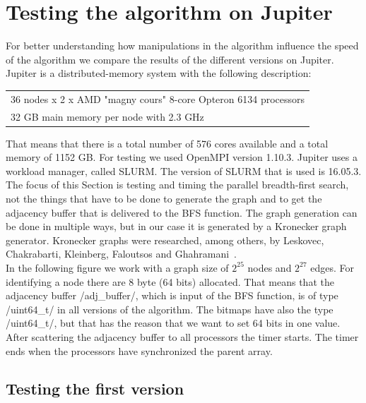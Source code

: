 \documentclass[12pt,a4paper]{article}
\begin{document}
\section{Testing the algorithm on Jupiter}
\label{sec:testing}

For better understanding how manipulations in the algorithm influence the speed of the algorithm we compare the results of the different versions on Jupiter.
Jupiter is a distributed-memory system with the following description:
\begin{flushleft}
\begin{tabular}{| l |}
  \hline
  36 nodes x 2 x AMD "magny cours" 8-core Opteron 6134 processors \\
  32 GB main memory per node with 2.3 GHz\\
  \hline
\end{tabular}
\end{flushleft}
That means that there is a total number of 576 cores available and a total memory of 1152 GB. For testing we used OpenMPI version 1.10.3. Jupiter uses a workload manager, called SLURM. The version of SLURM that is used is 16.05.3.\\
The focus of this Section is testing and timing the parallel breadth-first search, not the things that have to be done to generate the graph and to get the adjacency buffer that is delivered to the BFS function. The graph generation can be done in multiple ways, but in our case it is generated by a Kronecker graph generator. Kronecker graphs were researched, among others, by Leskovec, Chakrabarti, Kleinberg, Faloutsos and Ghahramani~\cite{kronecker}.\\
In the following figure we work with a graph size of \(2^{25}\) nodes and \(2^{27}\) edges. For identifying a node there are 8 byte (64 bits) allocated. That means that the adjacency buffer \cinline/adj_buffer/, which is input of the BFS function, is of type \cinline/uint64_t/ in all versions of the algorithm. The bitmaps have also the type \cinline/uint64_t/, but that has the reason that we want to set 64 bits in one value.\\
After scattering the adjacency buffer to all processors the timer starts. The timer ends when the processors have synchronized the parent array.

\subsection{Testing the first version}
\label{sec:testingall}
\end{document}

